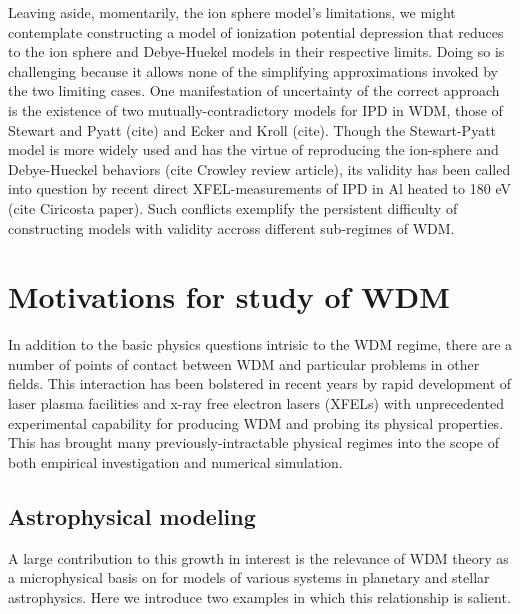 
Leaving aside, momentarily, the ion sphere model's limitations, we might contemplate constructing a model of ionization potential depression that reduces to the ion sphere and Debye-Huekel models in their respective limits. Doing so is challenging because it allows none of the simplifying approximations invoked by the two limiting cases. One manifestation of uncertainty of the correct approach is the existence of two mutually-contradictory models for IPD in WDM, those of Stewart and Pyatt (cite) and Ecker and Kroll (cite). Though the Stewart-Pyatt model is more widely used and has the virtue of reproducing the ion-sphere and Debye-Hueckel behaviors (cite Crowley review article), its validity has been called into question by recent direct XFEL-measurements of IPD in Al heated to 180 eV (cite Ciricosta paper). Such conflicts exemplify the persistent difficulty of constructing models with validity accross different sub-regimes of WDM.


\section{Motivations for study of WDM}
In addition to the basic physics questions intrisic to the WDM regime, there are a number of points of contact between WDM and particular problems in other fields. This interaction has been bolstered in recent years by rapid development of laser plasma facilities and x-ray free electron lasers (XFELs) with unprecedented experimental capability for producing WDM and probing its physical properties. This has brought many previously-intractable physical regimes into the scope of both empirical investigation and numerical simulation.  

\subsection{Astrophysical modeling}
A large contribution to this growth in interest is the relevance of WDM theory as a microphysical basis on for models of various systems in planetary and stellar astrophysics. Here we introduce two examples in which this relationship is salient.

